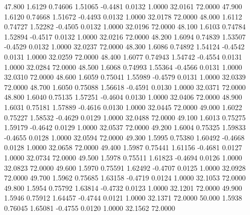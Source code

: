   47.800   1.6129   0.74606   1.51065  -0.4481   0.0132   1.0000  32.0161  72.0000
  47.900   1.6120   0.74668   1.51672  -0.4493   0.0132   1.0000  32.0178  72.0000
  48.000   1.6112   0.74727   1.52282  -0.4505   0.0132   1.0000  32.0196  72.0000
  48.100   1.6103   0.74784   1.52894  -0.4517   0.0132   1.0000  32.0216  72.0000
  48.200   1.6094   0.74839   1.53507  -0.4529   0.0132   1.0000  32.0237  72.0000
  48.300   1.6086   0.74892   1.54124  -0.4542   0.0131   1.0000  32.0259  72.0000
  48.400   1.6077   0.74943   1.54742  -0.4554   0.0131   1.0000  32.0284  72.0000
  48.500   1.6068   0.74993   1.55364  -0.4566   0.0131   1.0000  32.0310  72.0000
  48.600   1.6059   0.75041   1.55989  -0.4579   0.0131   1.0000  32.0339  72.0000
  48.700   1.6050   0.75088   1.56618  -0.4591   0.0130   1.0000  32.0371  72.0000
  48.800   1.6040   0.75135   1.57251  -0.4604   0.0130   1.0000  32.0406  72.0000
  48.900   1.6031   0.75181   1.57889  -0.4616   0.0130   1.0000  32.0445  72.0000
  49.000   1.6022   0.75227   1.58532  -0.4629   0.0129   1.0000  32.0488  72.0000
  49.100   1.6013   0.75275   1.59179  -0.4642   0.0129   1.0000  32.0537  72.0000
  49.200   1.6004   0.75325   1.59833  -0.4655   0.0128   1.0000  32.0594  72.0000
  49.300   1.5995   0.75380   1.60492  -0.4668   0.0128   1.0000  32.0658  72.0000
  49.400   1.5987   0.75441   1.61156  -0.4681   0.0127   1.0000  32.0734  72.0000
  49.500   1.5978   0.75511   1.61823  -0.4694   0.0126   1.0000  32.0823  72.0000
  49.600   1.5970   0.75591   1.62492  -0.4707   0.0125   1.0000  32.0928  72.0000
  49.700   1.5962   0.75685   1.63158  -0.4719   0.0124   1.0000  32.1053  72.0000
  49.800   1.5954   0.75792   1.63814  -0.4732   0.0123   1.0000  32.1201  72.0000
  49.900   1.5946   0.75912   1.64457  -0.4744   0.0121   1.0000  32.1371  72.0000
  50.000   1.5938   0.76045   1.65081  -0.4755   0.0120   1.0000  32.1562  72.0000

